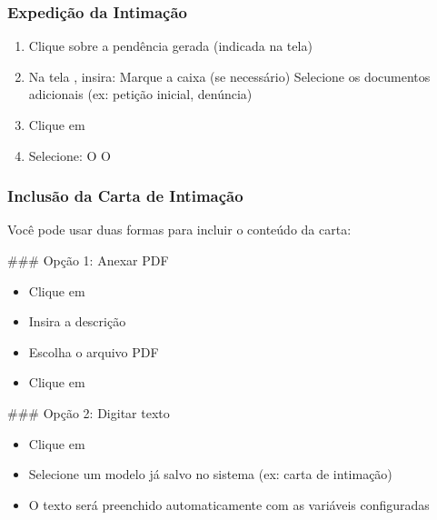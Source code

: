 \documentclass[letterpaper,10pt,brazil]{sphinxmanual}
\begin{document}
\subsubsection{Expedição da Intimação}
\label{\detokenize{projud_29_intimacaoARdigital:expedicao-da-intimacao}}\begin{enumerate}
%
\item {} 
\sphinxAtStartPar
Clique sobre a pendência gerada (indicada na tela)

\item {} 
\sphinxAtStartPar
Na tela , insira:
\sphinxhyphen{} 
\sphinxhyphen{} Marque a caixa  (se necessário)
\sphinxhyphen{} Selecione os documentos adicionais (ex: petição inicial, denúncia)

\item {} 
\sphinxAtStartPar
Clique em 

\item {} 
\sphinxAtStartPar
Selecione:
\sphinxhyphen{} O 
\sphinxhyphen{} O 

\end{enumerate}


\subsubsection{Inclusão da Carta de Intimação}
\label{\detokenize{projud_29_intimacaoARdigital:inclusao-da-carta-de-intimacao}}
\sphinxAtStartPar
Você pode usar duas formas para incluir o conteúdo da carta:

\sphinxAtStartPar
\#\#\# Opção 1: Anexar PDF
\begin{itemize}
\item {} 
\sphinxAtStartPar
Clique em 

\item {} 
\sphinxAtStartPar
Insira a descrição

\item {} 
\sphinxAtStartPar
Escolha o arquivo PDF

\item {} 
\sphinxAtStartPar
Clique em 

\end{itemize}

\sphinxAtStartPar
\#\#\# Opção 2: Digitar texto
\begin{itemize}
\item {} 
\sphinxAtStartPar
Clique em 

\item {} 
\sphinxAtStartPar
Selecione um modelo já salvo no sistema (ex: carta de intimação)

\item {} 
\sphinxAtStartPar
O texto será preenchido automaticamente com as variáveis configuradas

\end{itemize}
\end{document}
